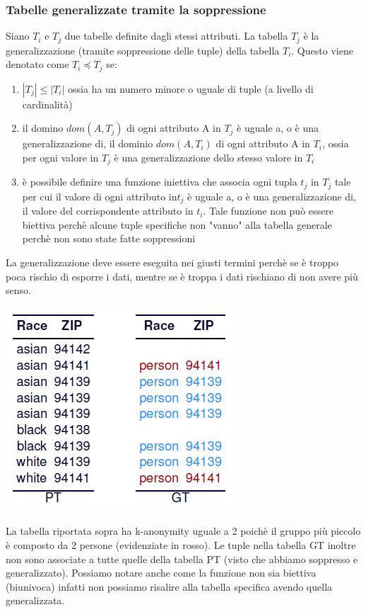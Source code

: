 \subsubsection{Tabelle generalizzate tramite la soppressione}
Siano \(T_i\) e \(T_j\) due tabelle definite dagli stessi attributi. La tabella \(T_j\) è la generalizzazione (tramite soppressione delle tuple) della tabella \(T_i\). Questo viene denotato come \(T_i \preceq T_j\) se:
\begin{enumerate}
    \item \(|T_j| \leq |T_i|\) ossia ha un numero minore o uguale di tuple (a livello di cardinalità) 
    \item il domino \(dom(A, T_j)\) di ogni attributo A in \(T_j\) è uguale a, o è una generalizzazione di, il dominio \(dom(A, T_i)\) di ogni attributo A in \(T_i\), ossia per ogni valore in \(T_j\) è una generalizzazione dello stesso valore in \(T_i\)
    \item è possibile definire una funzione iniettiva che associa ogni tupla \(t_j\) in \(T_j\) tale per cui il valore di ogni attributo in\(t_j\) è uguale a, o è una generalizzazione di, il valore del corrispondente attributo in \(t_i\). Tale funzione non può essere biettiva perchè alcune tuple specifiche non "vanno" alla tabella generale perchè non sono state fatte soppressioni
\end{enumerate}
La generalizzazione deve essere eseguita nei giusti termini perchè se è troppo poca rischio di esporre i dati, mentre se è troppa i dati rischiano di non avere più senso.
\begin{center}
    \includegraphics[scale=0.7]{img/tabgen.png}
\end{center}
La tabella riportata sopra ha k-anonymity uguale a 2 poichè il gruppo più piccolo è composto da 2 persone (evidenziate in rosso). 
Le tuple nella tabella GT inoltre non sono associate a tutte quelle della tabella PT (visto che abbiamo soppresso e generalizzato). Possiamo notare anche come la funzione non sia biettiva (biunivoca) infatti non possiamo risalire alla tabella specifica avendo quella generalizzata.

